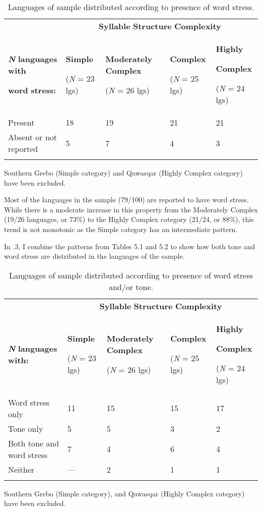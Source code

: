 \begin{table}
\begin{tabularx}{\textwidth}{XXXXX}
\lsptoprule
 & \multicolumn{4}{c}{ \textbf{Syllable} \textbf{Structure} \textbf{Complexity}}\\
{ \textbf{\textit{N}} \textbf{languages} \textbf{with} }

 \textbf{word} \textbf{stress:} & { \textbf{Simple}}

 (\textit{N} = 23 lgs) & { \textbf{Moderately} \textbf{Complex}}

 (\textit{N} = 26 lgs) & { \textbf{Complex}}

 (\textit{N} = 25 lgs) & { \textbf{Highly} }

{ \textbf{Complex}}

 (\textit{N} = 24 lgs)\\
 Present & 18 & 19 & 21 & 21\\
 Absent or not reported & 5 & 7 & 4 & 3\\
\lspbottomrule
\end{tabularx}
\caption{\label{5.2}Languages of sample distributed according to presence of word stress.}Southern Grebo (Simple category) and Qawasqar (Highly Complex category) have been excluded.
\end{table}

  Most of the languages in the sample (79/100) are reported to have word stress. While there is a moderate increase in this property from the Moderately Complex (19/26 languages, or 73\%) to the Highly Complex category (21/24, or 88\%), this trend is not monotonic as the Simple category has an intermediate pattern.

  In .3, I combine the patterns from Tables 5.1 and 5.2 to show how both tone and word stress are distributed in the languages of the sample.

\begin{table}
\begin{tabularx}{\textwidth}{XXXXX}
\lsptoprule
 & \multicolumn{4}{c}{ \textbf{Syllable} \textbf{Structure} \textbf{Complexity}}\\
 \textbf{\textit{N}} \textbf{languages} \textbf{with:} & { \textbf{Simple}}

 (\textit{N} = 23 lgs) & { \textbf{Moderately} \textbf{Complex}}

 (\textit{N} = 26 lgs) & { \textbf{Complex}}

 (\textit{N} = 25 lgs) & { \textbf{Highly} }

{ \textbf{Complex}}

 (\textit{N} = 24 lgs)\\
 Word stress only & 11 & 15 & 15 & 17\\
 Tone only & 5 & 5 & 3 & 2\\
 Both tone and word stress & 7 & 4 & 6 & 4\\
 Neither & — & 2 & 1 & 1\\
\lspbottomrule
\end{tabularx}
\caption{\label{5.3}Languages of sample distributed according to presence of word stress and/or tone.}Southern Grebo (Simple category), and Qawasqar (Highly Complex category) have been excluded.
\end{table}

